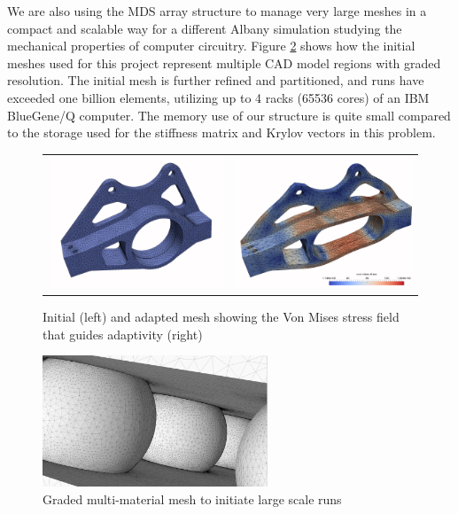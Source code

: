 We are also using the MDS array structure to manage very large meshes
in a compact and scalable way for a different Albany simulation
studying the mechanical properties of computer circuitry.
Figure \ref{fig:ibm} shows how the initial
meshes used for this project represent
multiple CAD model regions with graded resolution.
The initial mesh is further refined and partitioned,
and runs have exceeded one billion elements, utilizing
up to 4 racks (65536 cores) of an IBM BlueGene/Q computer.
The memory use of our structure is quite small compared
to the storage used for the stiffness matrix and
Krylov vectors in this problem.

\begin{figure}
\centering
\begin{tabular}{cc}
  \includegraphics[width=.5\textwidth]{albany1.png}&
  \includegraphics[width=.5\textwidth]{albany2.png}
\end{tabular}
\caption{Initial (left) and adapted mesh showing the Von Mises stress field that
guides adaptivity (right)} \label{fig:albany-mesh}
\end{figure}

\begin{figure}
\begin{center}
\includegraphics[width=0.6\textwidth]{ibm.png}
\caption{Graded multi-material mesh to initiate large scale runs}
\label{fig:ibm}
\end{center}
\end{figure}

